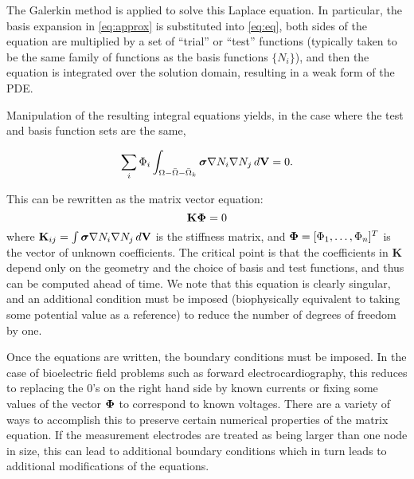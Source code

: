The Galerkin method is applied to solve this Laplace equation. In
particular, the basis expansion in \autoref{eq:approx} is substituted
into \autoref{eq:eq}, both sides of the equation are multiplied by a set
of ``trial'' or ``test'' functions (typically taken to be the same family of
functions as the basis functions $\{N_{i}\}$), and then the equation is
integrated over the solution domain, resulting in a weak form of the
PDE.

Manipulation of the resulting integral equations yields, in the case where
the test and basis function sets are the same,

\begin{equation} \sum_i \Phi_i \int_{\Omega - \bar{\Omega} -
\bar{\Omega}_k} \mbox{\boldmath $\sigma$} \nabla N_i \nabla N_j \, d\mathbf{V} = 0. \label{eq:int_eq}
\end{equation}

This can be rewritten as the matrix vector equation:
\begin{equation} \mathbf{K} \mbox{\boldmath $\Phi$} = 0 \label{eq:mat_eq}
\end{equation}
%
\noindent where $\mathbf{K}_{ij} = \int \mbox{\boldmath $\sigma$} \nabla N_i \nabla N_j \,
d\mathbf{V}$ is the stiffness matrix, and $\mbox{\boldmath $\Phi$} = [\Phi_1,
\ldots, \Phi_n]^T$ is the vector of unknown coefficients. The critical
point is that the coefficients in $\mathbf{K}$ depend only on the geometry
and the choice of basis and test functions, and thus can be computed ahead
of time. We note that this equation is clearly singular, and an additional
condition must be imposed (biophysically equivalent to taking some
potential value as a reference) to reduce the number of degrees of freedom
by one.

Once the equations are written, the boundary conditions must be imposed. In
the case of bioelectric field problems such as forward electrocardiography,
this reduces to replacing the $0$'s on the right hand side by known
currents or fixing some values of the vector $\mbox{\boldmath $\Phi$}$ to correspond to
known voltages. There are a variety of ways to accomplish this to preserve
certain numerical properties of the matrix equation. If the
measurement electrodes are treated as being larger than one node in size,
this can lead to additional boundary conditions which in turn leads to
additional modifications of the equations.

